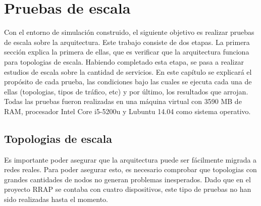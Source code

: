 \chapter{Pruebas de escala}
Con el entorno de simulación construido, el siguiente objetivo es realizar pruebas de escala sobre la arquitectura. Este trabajo consiste de dos etapas. La primera sección explica la primera de ellas, que es verificar que la arquitectura funciona para topologias de escala. Habiendo completado esta etapa, se pasa a realizar estudios de escala sobre la cantidad de servicios. En este capítulo se explicará el propósito de cada prueba, las condiciones bajo las cuales se ejecuta cada una de ellas (topologias, tipos de tráfico, etc) y por último, los resultados que arrojan. Todas las pruebas fueron realizadas en una máquina virtual con 3590 MB de RAM, procesador Intel Core i5-5200u y Lubuntu 14.04 como sistema operativo.

\section{Topologias de escala}
Es importante poder asegurar que la arquitectura puede ser fácilmente migrada a redes reales. Para poder asegurar esto, es necesario comprobar que topologias con grandes cantidades de nodos no generan problemas inesperados. Dado que en el proyecto RRAP se contaba con cuatro dispositivos, este tipo de pruebas no han sido realizadas hasta el momento.

